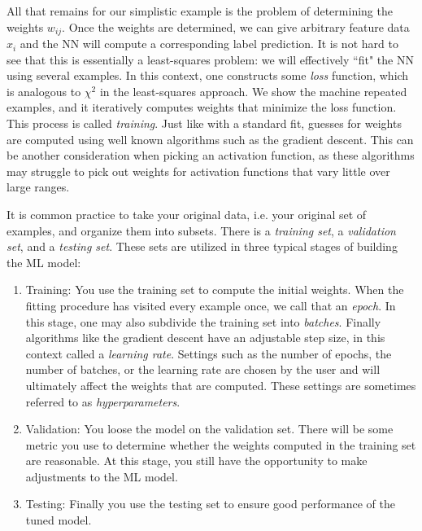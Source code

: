 All that remains for our simplistic example is the problem of determining
the weights $w_{ij}$. Once the weights are determined, we can give arbitrary
feature data $x_i$ and the NN will compute a corresponding label prediction. 
It is not hard to see that this is essentially a least-squares problem:
we will effectively ``fit" the NN using several examples.
In this context, one constructs some {\it loss} function,
which is analogous to $\chi^2$ in the least-squares approach.
We show the machine repeated examples, and it iteratively computes weights
that minimize the loss function. This process is called {\it
training}. Just like with a standard fit, guesses for weights
are computed using well known algorithms such as the gradient descent.
This can be another consideration when picking an activation function, as
these algorithms may struggle to pick out weights for activation functions 
that vary little over large ranges.

It is common practice to take your original data, i.e. your original set of
examples, and organize them into subsets. There is a {\it training
set}, a {\it validation set},
and a {\it testing set}. These sets are utilized in three
typical stages of building the ML model:
\begin{enumerate}
\item Training: You use the training set to compute the initial weights.
When the fitting procedure has visited every example once, we call
that an {\it epoch}. In this stage, one may also subdivide
the training set into {\it batches}. Finally algorithms
like the gradient descent have an adjustable step size, in this
context called a {\it learning rate}. Settings such 
as the number of epochs, the number of batches, or the learning rate 
are chosen by the user and will ultimately affect the
weights that are computed. These settings are sometimes referred to
as {\it hyperparameters}.
\item Validation: You loose the model on the 
validation set. There will
be some metric you use to determine whether the weights computed in
the training set are reasonable. At this stage, you still have the opportunity
to make adjustments to the ML model.
\item Testing: Finally you use the testing set to
ensure good performance of the tuned model.
\end{enumerate}


